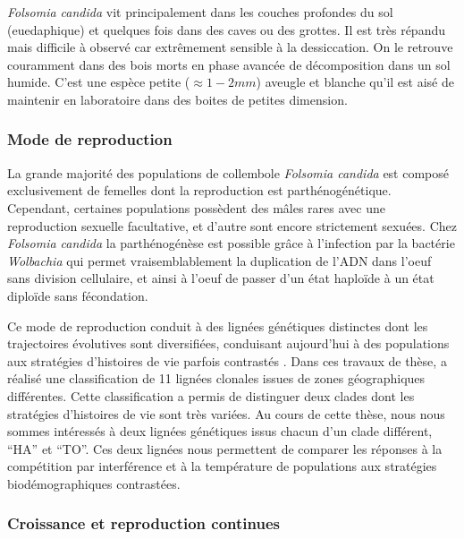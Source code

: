 \textit{Folsomia candida} vit principalement dans les couches profondes du sol
(euedaphique) et quelques fois dans des caves ou des grottes. Il est très
répandu mais difficile à observé car extrêmement sensible à la dessiccation. On
le retrouve couramment dans des bois morts en phase avancée de décomposition
dans un sol humide. C'est une espèce petite ($\approx 1 - 2 mm$) aveugle et
blanche qu'il est aisé de maintenir en laboratoire dans des boites de petites
dimension. 

\subsubsection{Mode de reproduction}

La grande majorité des populations de collembole \textit{Folsomia candida} est
composé exclusivement de femelles dont la reproduction est parthénogénétique.
Cependant, certaines populations possèdent des mâles rares avec une reproduction
sexuelle facultative, et d'autre sont encore strictement sexuées. Chez
\textit{Folsomia candida} la parthénogénèse est possible grâce à l'infection par
la bactérie \textit{Wolbachia} qui permet vraisemblablement la duplication de
l'ADN dans l'oeuf sans division cellulaire, et ainsi à l'oeuf de passer d'un
état haploïde à un état diploïde sans fécondation. 

Ce mode de reproduction conduit à des lignées génétiques distinctes dont les
trajectoires évolutives sont diversifiées, conduisant aujourd'hui à des
populations aux stratégies d'histoires de vie parfois contrastés
\autocites{tully2004a,tully2008a}. Dans ces travaux de thèse,
\textcites{tully2004a} a réalisé une classification de 11 lignées clonales
issues de zones géographiques différentes. Cette classification a permis de
distinguer deux clades dont les stratégies d'histoires de vie sont très variées.
Au cours de cette thèse, nous nous sommes intéressés à deux lignées génétiques
issus chacun d'un clade différent, ``HA'' et ``TO''. Ces deux lignées nous
permettent de comparer les réponses à la compétition par interférence et à la
température de populations aux stratégies biodémographiques contrastées.

\subsubsection{Croissance et reproduction continues}

